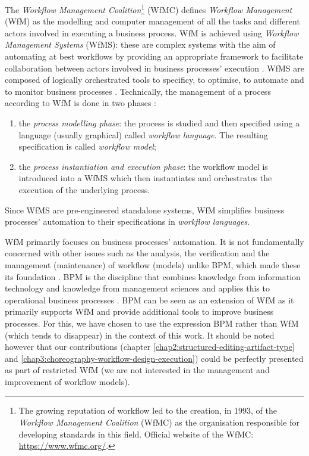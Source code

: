 The \textit{Workflow Management Coalition}\footnote{The growing reputation of workflow led to the creation, in 1993, of the \textit{Workflow Management Coalition} (WfMC) as the organisation responsible for developing standards in this field. Official website of the WfMC: \url{https://www.wfmc.org/}.} (WfMC) \cite{workflowModel} defines \textit{Workflow Management} (WfM) as the modelling and computer management of all the tasks and different actors involved in executing a business process. WfM is achieved using \textit{Workflow Management Systems} (WfMS): these are complex systems with the aim of automating at best workflows by providing an appropriate framework to facilitate collaboration between actors involved in business processes' execution \cite{workflow95, van2013business, van2015business, dumas2018fundamental}. WfMS are composed of logically orchestrated tools to specificy, to optimise, to automate and to monitor business processes \cite{workflowModel, dumas2018fundamental}. Technically, the management of a process according to WfM is done in two phases \cite{divitini2001inter}:
\begin{enumerate}
	\item the \textit{process modelling phase}: the process is studied and then specified using a language (usually graphical) called \textit{workflow language}. The resulting specification is called \textit{workflow model};
	\item the \textit{process instantiation and execution phase}: the workflow model is introduced into a WfMS which then instantiates and orchestrates the execution of the underlying process.
\end{enumerate}
Since WfMS are pre-engineered standalone systems, WfM simplifies business processes' automation to their specifications in \textit{workflow languages}.

WfM primarily focuses on business processes' automation. It is not fundamentally concerned with other issues such as the analysis, the verification and the management (maintenance) of workflow (models) unlike BPM, which made these its foundation \cite{van2016don}. BPM is the discipline that combines knowledge from information technology and knowledge from management sciences and applies this to operational business processes \cite{van2013business}. BPM can be seen as an extension of WfM as it primarily supports WfM and provide additional tools to improve business processes. For this, we have chosen to use the expression BPM rather than WfM (which tends to disappear) in the context of this work. It should be noted however that our contributions (chapter \ref{chap2:structured-editing-artifact-type} and \ref{chap3:choreography-workflow-design-execution}) could be perfectly presented as part of restricted WfM (we are not interested in the management and improvement of workflow models).



